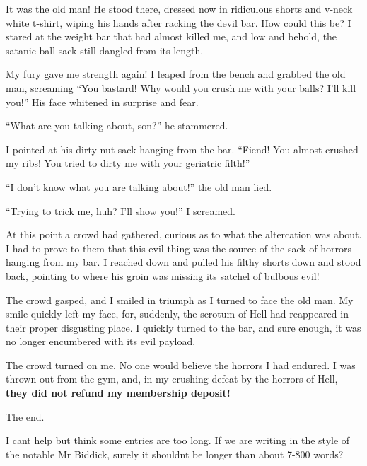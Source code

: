 It was the old man! He stood there, dressed now in ridiculous
shorts and v-neck white t-shirt, wiping his hands after racking the
devil bar. How could this be? I stared at the weight bar that had
almost killed me, and low and behold, the satanic ball sack still
dangled from its length.



My fury gave me strength again! I leaped from the bench and grabbed
the old man, screaming ``You bastard! Why would you crush me with
your balls? I'll kill you!'' His face whitened in surprise and
fear.



``What are you talking about, son?'' he stammered.



I pointed at his dirty nut sack hanging from the bar. ``Fiend! You
almost crushed my ribs! You tried to dirty me with your geriatric
filth!''



``I don't know what you are talking about!'' the old man lied.



``Trying to trick me, huh? I'll show you!'' I screamed.



At this point a crowd had gathered, curious as to what the
altercation was about. I had to prove to them that this evil thing
was the source of the sack of horrors hanging from my bar. I
reached down and pulled his filthy shorts down and stood back,
pointing to where his groin was missing its satchel of bulbous
evil!



The crowd gasped, and I smiled in triumph as I turned to face the
old man. My smile quickly left my face, for, suddenly, the scrotum
of Hell had reappeared in their proper disgusting place. I quickly
turned to the bar, and sure enough, it was no longer encumbered
with its evil payload.



The crowd turned on me. No one would believe the horrors I had
endured. I was thrown out from the gym, and, in my crushing defeat
by the horrors of Hell, {\bf they did not refund my membership
deposit!}



The end. 
 





I cant help but think some entries are too long. If we are writing
in the style of the notable Mr Biddick, surely it shouldnt be
longer than about 7-800 words? 
 



